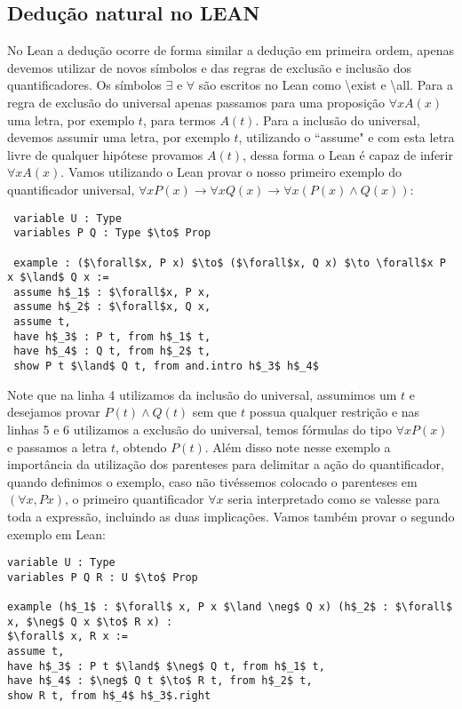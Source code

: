 \subsection{Dedução natural no LEAN}
No Lean a dedução ocorre de forma similar a dedução em primeira ordem, apenas devemos utilizar de novos símbolos e das 
regras de exclusão e inclusão dos quantificadores. Os símbolos $\exists $ e $\forall $ são escritos no Lean como \textbackslash exist 
e  \textbackslash all. Para a regra de exclusão do universal apenas passamos para uma proposição $\forall x A(x)$ uma letra,
por exemplo $t$, para termos $A(t)$. Para a inclusão do universal, devemos assumir uma letra, por exemplo $t$, utilizando o
``assume" e com esta letra livre de qualquer hipótese provamos $A(t)$, dessa forma o Lean é capaz de inferir $\forall x A(x)$.
\newline Vamos utilizando o Lean provar o nosso primeiro exemplo do quantificador universal, $\forall xP(x) \to \forall x Q(x) \to \forall x(P(x) \land Q(x))$:
\begin{lstlisting}
 variable U : Type
 variables P Q : Type $\to$ Prop

 example : ($\forall$x, P x) $\to$ ($\forall$x, Q x) $\to \forall$x P x $\land$ Q x :=  
 assume h$_1$ : $\forall$x, P x,
 assume h$_2$ : $\forall$x, Q x,
 assume t,
 have h$_3$ : P t, from h$_1$ t,
 have h$_4$ : Q t, from h$_2$ t,
 show P t $\land$ Q t, from and.intro h$_3$ h$_4$ 
\end{lstlisting}
Note que na linha 4 utilizamos da inclusão do universal, assumimos um $t$ e desejamos provar $P(t) \land Q(t)$ 
sem que $t$ possua qualquer restrição e nas linhas 5 e 6 utilizamos a exclusão do universal, temos fórmulas do
tipo $\forall x P(x)$ e passamos a letra $t$, obtendo $P(t)$. Além disso note nesse exemplo a importância da utilização
dos parenteses para delimitar a ação do quantificador, quando definimos o exemplo, caso não tivéssemos colocado
o parenteses em  $(\forall x, P x)$, o primeiro quantificador $\forall x$ seria interpretado como se valesse para toda
a expressão, incluindo as duas implicações.
\newline Vamos também provar o segundo exemplo em Lean:
\begin{lstlisting}
variable U : Type
variables P Q R : U $\to$ Prop

example (h$_1$ : $\forall$ x, P x $\land \neg$ Q x) (h$_2$ : $\forall$ x, $\neg$ Q x $\to$ R x) :
$\forall$ x, R x :=
assume t,
have h$_3$ : P t $\land$ $\neg$ Q t, from h$_1$ t,
have h$_4$ : $\neg$ Q t $\to$ R t, from h$_2$ t,
show R t, from h$_4$ h$_3$.right
\end{lstlisting}
